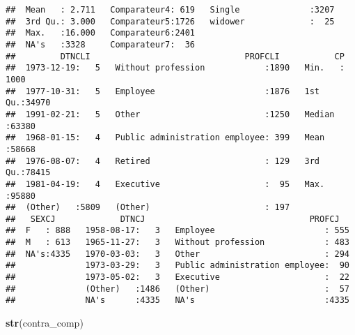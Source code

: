 \documentclass[
]{article}
\newenvironment{Shaded}{\begin{snugshade}}{\end{snugshade}}
\newcommand{\KeywordTok}[1]{\textcolor[rgb]{0.13,0.29,0.53}{\textbf{#1}}}
\newcommand{\NormalTok}[1]{#1}
\begin{document}
\begin{verbatim}
##  Mean   : 2.711   Comparateur4: 619   Single              :3207           
##  3rd Qu.: 3.000   Comparateur5:1726   widower             :  25           
##  Max.   :16.000   Comparateur6:2401                                       
##  NA's   :3328     Comparateur7:  36                                       
##         DTNCLI                               PROFCLI           CP       
##  1973-12-19:   5   Without profession            :1890   Min.   : 1000  
##  1977-10-31:   5   Employee                      :1876   1st Qu.:34970  
##  1991-02-21:   5   Other                         :1250   Median :63380  
##  1968-01-15:   4   Public administration employee: 399   Mean   :58668  
##  1976-08-07:   4   Retired                       : 129   3rd Qu.:78415  
##  1981-04-19:   4   Executive                     :  95   Max.   :95880  
##  (Other)   :5809   (Other)                       : 197                  
##   SEXCJ             DTNCJ                                 PROFCJ    
##  F   : 888   1958-08-17:   3   Employee                      : 555  
##  M   : 613   1965-11-27:   3   Without profession            : 483  
##  NA's:4335   1970-03-03:   3   Other                         : 294  
##              1973-03-29:   3   Public administration employee:  90  
##              1973-05-02:   3   Executive                     :  22  
##              (Other)   :1486   (Other)                       :  57  
##              NA's      :4335   NA's                          :4335
\end{verbatim}

\begin{Shaded}
\begin{Highlighting}[]
\KeywordTok{str}\NormalTok{(contra_comp)}
\end{Highlighting}
\end{Shaded}
\end{document}
